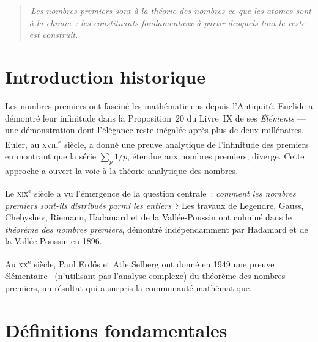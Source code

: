 \documentclass[12pt,a4paper,openany]{book}
\theoremstyle{definition}
\theoremstyle{plain}
\theoremstyle{remark}
\providecommand{\og}{\guillemotleft\,}
\providecommand{\fg}{\,\guillemotright}
\begin{document}

\begin{quote}
\itshape
\og Les nombres premiers sont à la théorie des nombres ce que les atomes sont à la
chimie~: les constituants fondamentaux à partir desquels tout le reste est
construit. \fg{}
\end{quote}

\bigskip

\section{Introduction historique}
\label{sec:ch2:intro}


Les nombres premiers ont fasciné les mathématiciens depuis l'Antiquité.
Euclide a démontré leur infinitude dans la Proposition~20 du
Livre~IX de ses \textit{Éléments} --- une démonstration dont l'élégance reste
inégalée après plus de deux millénaires. Euler, au
\textsc{xviii}\textsuperscript{e} siècle, a donné une preuve analytique de
l'infinitude des premiers en montrant que la série $\sum_{p} 1/p$, étendue aux
nombres premiers, diverge. Cette approche a ouvert la voie à la théorie analytique
des nombres.

Le \textsc{xix}\textsuperscript{e} siècle a vu l'émergence de la question centrale~:
\emph{comment les nombres premiers sont-ils distribués parmi les entiers ?} Les
travaux de Legendre,
Gauss,
Chebyshev,
Riemann,
Hadamard et
de la Vallée-Poussin ont culminé dans le
\emph{théorème des nombres premiers}, démontré
indépendamment par Hadamard et de la Vallée-Poussin en 1896.

Au \textsc{xx}\textsuperscript{e} siècle, Paul Erdős et
Atle Selberg ont donné en 1949 une preuve \og élémentaire \fg{}
(n'utilisant pas l'analyse complexe) du théorème des nombres premiers, un résultat qui
a surpris la communauté mathématique.

\section{Définitions fondamentales}
\label{sec:ch2:definitions}
\end{document}
